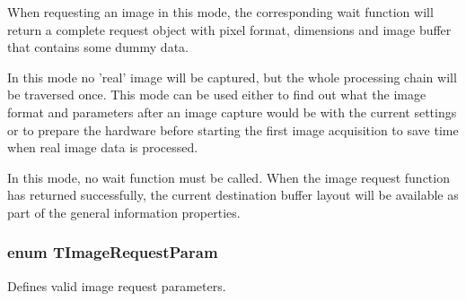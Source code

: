 \begin{Desc}
\begin{description}
When requesting an image in this mode, the corresponding wait function will return a complete request object with pixel format, dimensions and image buffer that contains some dummy data. \item[{\em 
\hypertarget{group___common_interface_gga9e620f0553e3519d83067243240c4518a287af4d17847600a3e86a984dec77094}{ircm\+Update\+Buffer\+Layout}\label{group___common_interface_gga9e620f0553e3519d83067243240c4518a287af4d17847600a3e86a984dec77094}
}]In this mode no 'real' image will be captured, but the whole processing chain will be traversed once. This mode can be used either to find out what the image format and parameters after an image capture would be with the current settings or to prepare the hardware before starting the first image acquisition to save time when real image data is processed.

In this mode, no wait function must be called. When the image request function has returned successfully, the current destination buffer layout will be available as part of the general information properties. \end{description}
\end{Desc}
\hypertarget{group___common_interface_gacaa0c121e27845c1d6db0d8daf7b57b4}{
\subsubsection[{T\+Image\+Request\+Param}]{\setlength{\rightskip}{0pt plus 5cm}enum {\bf T\+Image\+Request\+Param}}}\label{group___common_interface_gacaa0c121e27845c1d6db0d8daf7b57b4}


Defines valid image request parameters. 

